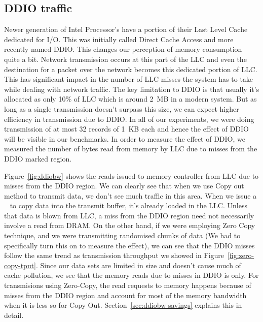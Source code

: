 \subsection{DDIO traffic}

Newer generation of Intel Processor's have a portion of their Last Level Cache dedicated for I/O. This was initially called Direct Cache Access\textregistered 
and more recently named DDIO\textregistered. This changes our perception of memory consumption quite a bit. Network transmission occurs at this part of the LLC 
and even the destination for a packet over the network becomes this dedicated portion of LLC. This has significant impact in the number of LLC misses the system 
has to take while dealing with network traffic. The key limitation to DDIO is that usually it's allocated as only 10\% of LLC which is around 2~MB in a modern system. 
But as long as a single transmission doesn't surpass this size, we can expect higher efficiency in transmission due to DDIO. In all of our experiments, we were doing transmission of 
at most 32 records of 1~KB each and hence the effect of DDIO will be visible in our benchmarks. In order to measure the 
effect of DDIO, we measured the number of bytes read from memory by LLC due to misses from the DDIO marked region. 

Figure~\ref{fig:ddiobw} shows the reads issued to memory controller from LLC due to misses from the  DDIO region. We can clearly see that when we use Copy out 
method to transmit data, we don't see much traffic in this area. When we issue a \memcpy~ to copy data into the transmit buffer, it's already loaded in the LLC. 
Unless that data is blown from LLC, a miss from the DDIO region need not necessarily involve a read from DRAM. On the other hand, if we were employing Zero Copy technique, 
and we were transmitting randomised chunks of data (We had to specifically turn this on to measure the effect), we can see that the DDIO misses follow the same trend 
as transmission throughput we showed in Figure~\ref{fig:zero-copy-tput}. Since our data sets are limited in size and doesn't cause much of cache pollution, we see that the 
memory reads due to misses in DDIO is only. For transmisions using Zero-Copy, the read requests to memory happens because of misses from the DDIO region and account for 
most of the memory bandwidth when it is less so for Copy Out. Section~\ref{sec:ddiobw-savings} explains this in detail.



